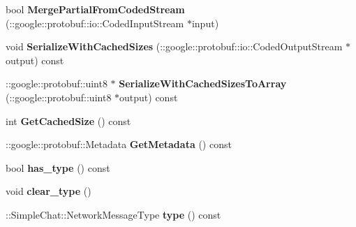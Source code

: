 \begin{DoxyCompactItemize}
\item 
\hypertarget{classSimpleChat_1_1NetworkMessageHeader_a2581c3d79e42bd4d3ac450a4437852c4}{bool {\bfseries Merge\-Partial\-From\-Coded\-Stream} (\-::google\-::protobuf\-::io\-::\-Coded\-Input\-Stream $\ast$input)}\label{classSimpleChat_1_1NetworkMessageHeader_a2581c3d79e42bd4d3ac450a4437852c4}

\item 
\hypertarget{classSimpleChat_1_1NetworkMessageHeader_a01d04719c32328fb2bb106e89790fd72}{void {\bfseries Serialize\-With\-Cached\-Sizes} (\-::google\-::protobuf\-::io\-::\-Coded\-Output\-Stream $\ast$output) const }\label{classSimpleChat_1_1NetworkMessageHeader_a01d04719c32328fb2bb106e89790fd72}

\item 
\hypertarget{classSimpleChat_1_1NetworkMessageHeader_a23591751df56360a33c07b61206bde95}{\-::google\-::protobuf\-::uint8 $\ast$ {\bfseries Serialize\-With\-Cached\-Sizes\-To\-Array} (\-::google\-::protobuf\-::uint8 $\ast$output) const }\label{classSimpleChat_1_1NetworkMessageHeader_a23591751df56360a33c07b61206bde95}

\item 
\hypertarget{classSimpleChat_1_1NetworkMessageHeader_aa031119fe9b93440b129d9dea6f42c3d}{int {\bfseries Get\-Cached\-Size} () const }\label{classSimpleChat_1_1NetworkMessageHeader_aa031119fe9b93440b129d9dea6f42c3d}

\item 
\hypertarget{classSimpleChat_1_1NetworkMessageHeader_ad784a116c57d281e27fb07daaf1bb37e}{\-::google\-::protobuf\-::\-Metadata {\bfseries Get\-Metadata} () const }\label{classSimpleChat_1_1NetworkMessageHeader_ad784a116c57d281e27fb07daaf1bb37e}

\item 
\hypertarget{classSimpleChat_1_1NetworkMessageHeader_a053ce1d5b479c63b4eec557e5a329ff0}{bool {\bfseries has\-\_\-type} () const }\label{classSimpleChat_1_1NetworkMessageHeader_a053ce1d5b479c63b4eec557e5a329ff0}

\item 
\hypertarget{classSimpleChat_1_1NetworkMessageHeader_a370f33ee9694bedca599961ce3842678}{void {\bfseries clear\-\_\-type} ()}\label{classSimpleChat_1_1NetworkMessageHeader_a370f33ee9694bedca599961ce3842678}

\item 
\hypertarget{classSimpleChat_1_1NetworkMessageHeader_ae0edc205c59584f4ad6bcbc077ea23cb}{\-::Simple\-Chat\-::\-Network\-Message\-Type {\bfseries type} () const }\label{classSimpleChat_1_1NetworkMessageHeader_ae0edc205c59584f4ad6bcbc077ea23cb}


\end{DoxyCompactItemize}
